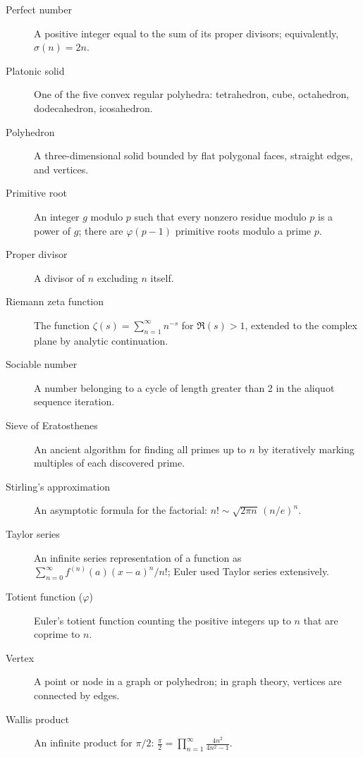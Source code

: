 \begin{description}
\item[Perfect number] A positive integer equal to the sum of its proper divisors; equivalently, $\sigma(n) = 2n$.

\item[Platonic solid] One of the five convex regular polyhedra: tetrahedron, cube, octahedron, dodecahedron, icosahedron.

\item[Polyhedron] A three-dimensional solid bounded by flat polygonal faces, straight edges, and vertices.

\item[Primitive root] An integer $g$ modulo $p$ such that every nonzero residue modulo $p$ is a power of $g$; there are $\varphi(p-1)$ primitive roots modulo a prime $p$.

\item[Proper divisor] A divisor of $n$ excluding $n$ itself.

\item[Riemann zeta function] The function $\zeta(s) = \sum_{n=1}^{\infty} n^{-s}$ for $\Re(s) > 1$, extended to the complex plane by analytic continuation.

\item[Sociable number] A number belonging to a cycle of length greater than 2 in the aliquot sequence iteration.

\item[Sieve of Eratosthenes] An ancient algorithm for finding all primes up to $n$ by iteratively marking multiples of each discovered prime.

\item[Stirling's approximation] An asymptotic formula for the factorial: $n! \sim \sqrt{2\pi n}\,(n/e)^n$.

\item[Taylor series] An infinite series representation of a function as $\sum_{n=0}^{\infty} f^{(n)}(a)(x-a)^n/n!$; Euler used Taylor series extensively.

\item[Totient function ($\varphi$)] Euler's totient function counting the positive integers up to $n$ that are coprime to $n$.

\item[Vertex] A point or node in a graph or polyhedron; in graph theory, vertices are connected by edges.

\item[Wallis product] An infinite product for $\pi/2$: $\frac{\pi}{2} = \prod_{n=1}^{\infty} \frac{4n^2}{4n^2 - 1}$.


\end{description}
